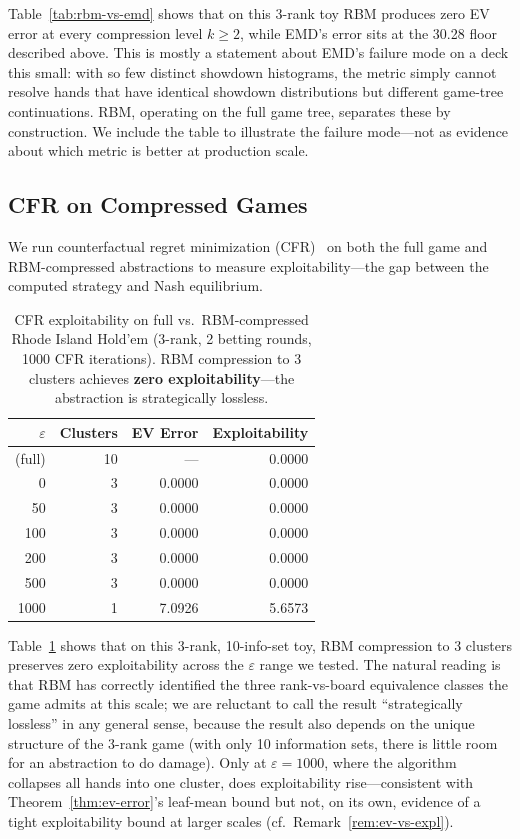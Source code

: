\documentclass[11pt]{article}
\begin{document}
Table~\ref{tab:rbm-vs-emd} shows that on this 3-rank toy RBM produces
zero EV error at every compression level $k \ge 2$, while EMD's error
sits at the 30.28 floor described above. This is mostly a statement
about EMD's failure mode on a deck this small: with so few distinct
showdown histograms, the metric simply cannot resolve hands that have
identical showdown distributions but different game-tree continuations.
RBM, operating on the full game tree, separates these by construction.
We include the table to illustrate the failure mode---not as evidence
about which metric is better at production scale.

\subsection{CFR on Compressed Games}

We run counterfactual regret minimization (CFR)~\citep{zinkevich2007regret}
on both the full game and RBM-compressed abstractions to measure
exploitability---the gap between the computed strategy and Nash
equilibrium.

\begin{table}[t]
\centering
\caption{CFR exploitability on full vs.\ RBM-compressed Rhode Island
Hold'em (3-rank, 2 betting rounds, 1000 CFR iterations). RBM
compression to 3 clusters achieves \textbf{zero exploitability}---the
abstraction is strategically lossless.}
\label{tab:cfr}
\begin{tabular}{rrrr}
\toprule
$\varepsilon$ & Clusters & EV Error & Exploitability \\
\midrule
(full) & 10 & --- & 0.0000 \\
0 & 3 & 0.0000 & 0.0000 \\
50 & 3 & 0.0000 & 0.0000 \\
100 & 3 & 0.0000 & 0.0000 \\
200 & 3 & 0.0000 & 0.0000 \\
500 & 3 & 0.0000 & 0.0000 \\
1000 & 1 & 7.0926 & 5.6573 \\
\bottomrule
\end{tabular}
\end{table}

Table~\ref{tab:cfr} shows that on this 3-rank, 10-info-set toy, RBM
compression to 3 clusters preserves zero exploitability across the
$\varepsilon$ range we tested. The natural reading is that RBM has
correctly identified the three rank-vs-board equivalence classes the
game admits at this scale; we are reluctant to call the result
``strategically lossless'' in any general sense, because the result
also depends on the unique structure of the 3-rank game (with only 10
information sets, there is little room for an abstraction to do
damage). Only at $\varepsilon = 1000$, where the algorithm collapses
all hands into one cluster, does exploitability rise---consistent with
Theorem~\ref{thm:ev-error}'s leaf-mean bound but not, on its own,
evidence of a tight exploitability bound at larger scales (cf.\
Remark~\ref{rem:ev-vs-expl}).
\end{document}
